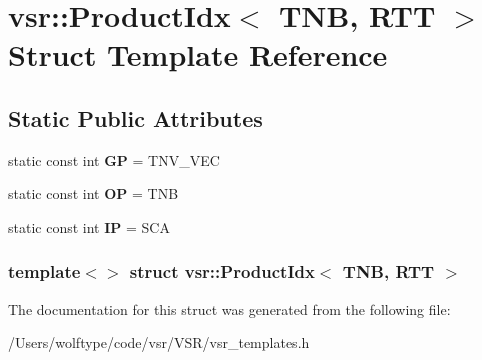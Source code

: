 \hypertarget{structvsr_1_1_product_idx_3_01_t_n_b_00_01_r_t_t_01_4}{\section{vsr\-:\-:Product\-Idx$<$ T\-N\-B, R\-T\-T $>$ Struct Template Reference}
\label{structvsr_1_1_product_idx_3_01_t_n_b_00_01_r_t_t_01_4}
}
\subsection*{Static Public Attributes}
\begin{DoxyCompactItemize}
\item 
\hypertarget{structvsr_1_1_product_idx_3_01_t_n_b_00_01_r_t_t_01_4_ac6c54f3abdc24a09f4977dbb27fc0bf1}{static const int {\bfseries G\-P} = T\-N\-V\-\_\-\-V\-E\-C}\label{structvsr_1_1_product_idx_3_01_t_n_b_00_01_r_t_t_01_4_ac6c54f3abdc24a09f4977dbb27fc0bf1}

\item 
\hypertarget{structvsr_1_1_product_idx_3_01_t_n_b_00_01_r_t_t_01_4_a77f55572dc61874fee5cad5cbb076ad2}{static const int {\bfseries O\-P} = T\-N\-B}\label{structvsr_1_1_product_idx_3_01_t_n_b_00_01_r_t_t_01_4_a77f55572dc61874fee5cad5cbb076ad2}

\item 
\hypertarget{structvsr_1_1_product_idx_3_01_t_n_b_00_01_r_t_t_01_4_a54364924deafad6ccafe6eaa04957771}{static const int {\bfseries I\-P} = S\-C\-A}\label{structvsr_1_1_product_idx_3_01_t_n_b_00_01_r_t_t_01_4_a54364924deafad6ccafe6eaa04957771}

\end{DoxyCompactItemize}
\subsubsection*{template$<$$>$ struct vsr\-::\-Product\-Idx$<$ T\-N\-B, R\-T\-T $>$}



The documentation for this struct was generated from the following file\-:\begin{DoxyCompactItemize}
\item 
/\-Users/wolftype/code/vsr/\-V\-S\-R/vsr\-\_\-templates.\-h\end{DoxyCompactItemize}
